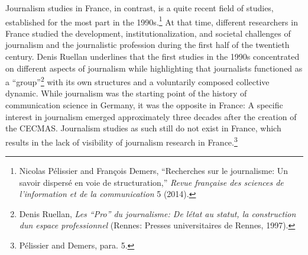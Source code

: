 \documentclass{tufte-handout}
\begin{document}
Journalism studies in France, in contrast, is a quite recent field of
studies, established for the most part in the 1990s.\footnote{Nicolas
  Pélissier and François Demers, ``Recherches sur le journalisme: Un
  savoir dispersé en voie de structuration,'' \emph{Revue française des
  sciences de l'information et de la communication} 5 (2014).} At that
time, different researchers in France studied the development,
institutionalization, and societal challenges of journalism and the
journalistic profession during the first half of the twentieth century.
Denis Ruellan underlines that the first studies in the 1990s
concentrated on different aspects of journalism while highlighting that
journalists functioned as a ``group''\footnote{Denis Ruellan, \emph{Les
  ``Pro'' du journalisme: De l\textquotesingle état au statut, la
  construction d\textquotesingle un espace professionnel} (Rennes:
  Presses universitaires de Rennes, 1997).} with its own structures and
a voluntarily composed collective dynamic. While journalism was the
starting point of the history of communication science in Germany, it
was the opposite in France: A specific interest in journalism emerged
approximately three decades after the creation of the CECMAS. Journalism
studies as such still do not exist in France, which results in the lack
of visibility of journalism research in France.\footnote{Pélissier and
  Demers, para. 5.}
\end{document}
